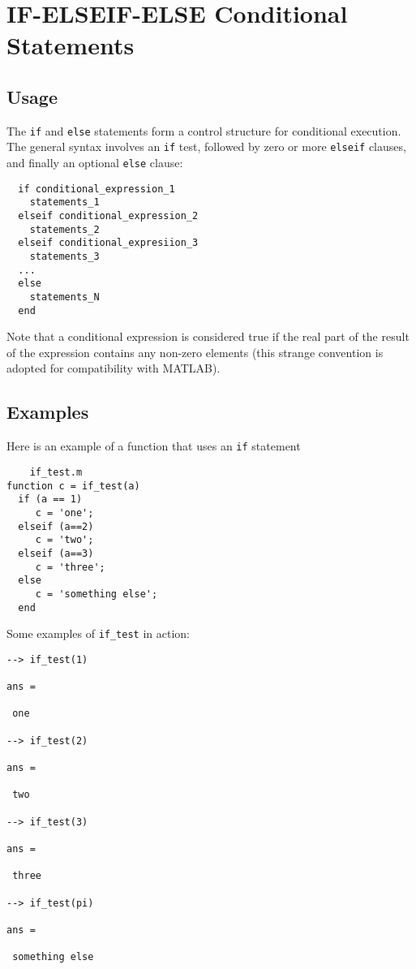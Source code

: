\section{IF-ELSEIF-ELSE Conditional Statements}

\subsection{Usage}

The \verb|if| and \verb|else| statements form a control structure for
conditional execution.  The general syntax involves an \verb|if|
test, followed by zero or more \verb|elseif| clauses, and finally
an optional \verb|else| clause:
\begin{verbatim}
  if conditional_expression_1
    statements_1
  elseif conditional_expression_2
    statements_2
  elseif conditional_expresiion_3
    statements_3
  ...
  else
    statements_N
  end
\end{verbatim}
Note that a conditional expression is considered true if 
the real part of the result of the expression contains
any non-zero elements (this strange convention is adopted
for compatibility with MATLAB).
\subsection{Examples}

Here is an example of a function that uses an \verb|if| statement
\begin{verbatim}
    if_test.m
function c = if_test(a)
  if (a == 1)
     c = 'one';
  elseif (a==2)
     c = 'two';
  elseif (a==3)
     c = 'three';
  else
     c = 'something else';
  end
\end{verbatim}
Some examples of \verb|if_test| in action:
\begin{verbatim}
--> if_test(1)

ans = 

 one

--> if_test(2)

ans = 

 two

--> if_test(3)

ans = 

 three

--> if_test(pi)

ans = 

 something else
\end{verbatim}
